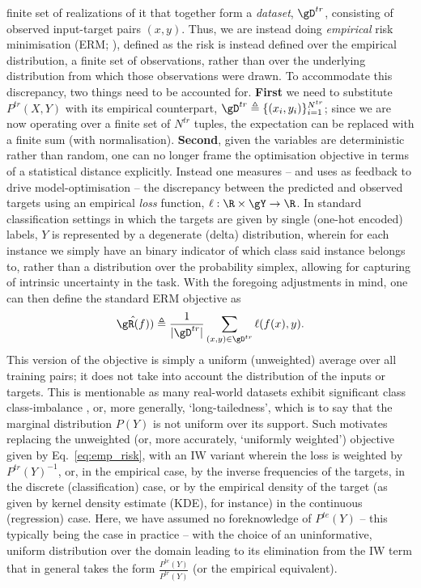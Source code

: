 finite set of realizations of it that together form a \emph{dataset}, \( \gD^{tr} \), consisting of
observed input-target pairs \( (x, y) \). 
%
Thus, we are instead doing \emph{empirical} risk minimisation (\ac{ERM};
\cite{vapnik1991principles}), defined as the risk is instead defined over the empirical
distribution, a finite set of observations, rather than over the underlying distribution from which
those observations were drawn.
To accommodate this discrepancy, two things need to be accounted for. 
%
\textbf{First} we need to  substitute \( P^{tr}(X, Y) \) with its empirical counterpart, \( \gD^{tr}
\triangleq \{(x_i, y_i) \}_{i=1}^{N^{tr}} \); since we are now operating over a finite set of \(
N^{tr} \) tuples, the expectation can be replaced with a finite sum (with normalisation). 
%
\textbf{Second}, given the variables are deterministic rather than random, one can no longer frame the
optimisation objective in terms of a statistical distance explicitly. 
%
Instead one measures -- and uses as feedback to drive model-optimisation -- the discrepancy between
the predicted and observed targets using an empirical \emph{loss} function, \( \ell: \R \times \gY
\to \R \). 
%
In standard classification settings in which the targets are given by single (one-hot encoded)
labels, \( Y \) is represented by a degenerate (delta) distribution, wherein for each instance we
simply have an binary indicator of which class said instance belongs to, rather than a distribution
over the probability simplex, allowing for capturing of intrinsic uncertainty in the task.
%
With the foregoing adjustments in mind, one can then define the standard \ac{ERM} objective as
\begin{equation*}\label{eq:emp_risk} \hat{\gR(f)}) \triangleq \frac{1}{|\gD^{tr}|}  \sum_{(x, y)
\in \gD^{tr}} \ell (f(x), y). \end{equation*}
%
This version of the objective is simply a uniform (unweighted) average over all training pairs; it
does not take into account the distribution of the inputs or targets.
%
This is mentionable as many real-world datasets exhibit significant class class-imbalance
\citep{zhu2014capturing, van2017devil}, or, more generally, `long-tailedness', which is to say that
the marginal distribution \( P(Y) \) is not uniform over its support.
Such motivates replacing the unweighted (or, more accurately, `uniformly weighted') objective given
by Eq.~\ref{eq:emp_risk}, with an \ac{IW} variant wherein the loss is weighted
by \( P^{tr}(Y)^{-1} \), or, in the empirical case, by the inverse frequencies of the targets, in
the discrete (classification) case, or by the empirical density of the target (as given by kernel
density estimate (KDE), for instance) in the continuous (regression) case.
Here, we have assumed no foreknowledge of \( P^{te}(Y) \) -- this typically being the case in
practice -- with the choice of an uninformative, uniform distribution over the domain leading to
its elimination from the \ac{IW} term that in general takes the form \( \frac{ P^{te}(Y) }{
P^{tr}(Y) } \) (or the empirical equivalent).

